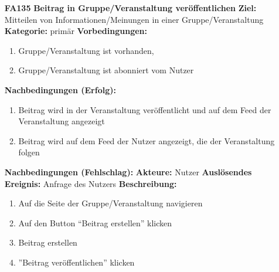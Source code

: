 \documentclass[parskip=full]{scrartcl}
\begin{document}
\begin{itemize}[nosep]
		\item[\textbf{FA135}]\textbf{Beitrag in Gruppe/Veranstaltung veröffentlichen}
		\newline \textbf{Ziel:} Mitteilen von Informationen/Meinungen in einer Gruppe/Veranstaltung
		\newline \textbf{Kategorie:} primär
		\newline \textbf{Vorbedingungen:}
		\begin{enumerate}[nosep]
			\item Gruppe/Veranstaltung ist vorhanden,
			\item Gruppe/Veranstaltung ist abonniert vom Nutzer
		\end{enumerate}
		\textbf{Nachbedingungen (Erfolg):}
		\begin{enumerate}[nosep]
			\item Beitrag wird in der Veranstaltung veröffentlicht und auf dem Feed der Veranstaltung angezeigt
			\item Beitrag wird auf dem Feed der Nutzer angezeigt, die der Veranstaltung folgen
		\end{enumerate}
		\textbf{Nachbedingungen (Fehlschlag):}
		\newline \textbf{Akteure:} Nutzer
		\newline \textbf{Auslösendes Ereignis:} Anfrage des Nutzers
		\newline \textbf{Beschreibung:}
		\begin{enumerate}[nosep]
			\item Auf die Seite der Gruppe/Veranstaltung navigieren
			\item Auf den Button “Beitrag erstellen” klicken
			\item Beitrag erstellen
			\item ”Beitrag veröffentlichen” klicken\\
		\end{enumerate}


\end{itemize}
\end{document}
